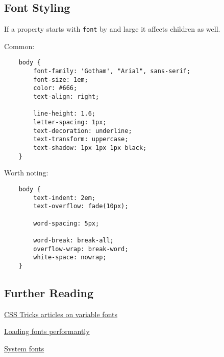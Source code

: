 \subsection{Font Styling}

If a property starts with \texttt{font} by and large it affects children as well.

Common:

\begin{verbatim}
    body {
        font-family: 'Gotham', "Arial", sans-serif;
        font-size: 1em;
        color: #666;
        text-align: right;

        line-height: 1.6;
        letter-spacing: 1px;
        text-decoration: underline;
        text-transform: uppercase;
        text-shadow: 1px 1px 1px black;
    }
\end{verbatim}

Worth noting:

\begin{verbatim}
    body {
        text-indent: 2em;
        text-overflow: fade(10px);

        word-spacing: 5px;

        word-break: break-all;
        overflow-wrap: break-word;
        white-space: nowrap;
    }
\end{verbatim}

\subsection{Further Reading}

\href{https://css-tricks.com/guides/opentype-variable-fonts/}{CSS Tricks articles on variable fonts}

\href{https://css-tricks.com/fout-foit-foft/}{Loading fonts performantly}

\href{https://css-tricks.com/snippets/css/system-font-stack/}{System fonts}

